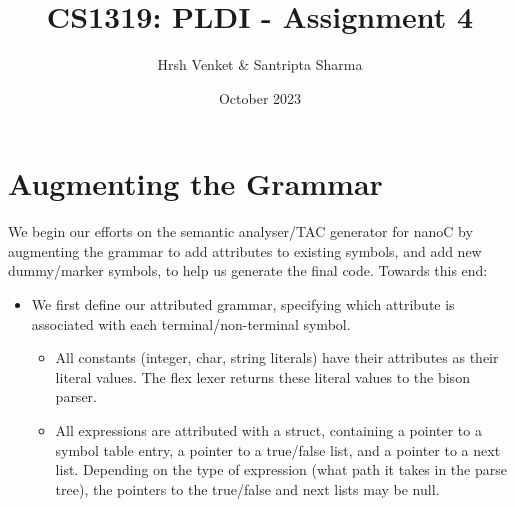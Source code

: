 \documentclass{article}
\title{CS1319: PLDI - Assignment 4}
\author{Hrsh Venket \& Santripta Sharma}
\date{October 2023}
\begin{document}
\maketitle 

\section{Augmenting the Grammar}
We begin our efforts on the semantic analyser/TAC generator for nanoC by augmenting the grammar to add attributes to existing symbols, and add new dummy/marker symbols, to help us generate the final code. Towards this end:

\begin{itemize}
	\item We first define our attributed grammar, specifying which attribute is associated with each terminal/non-terminal symbol. \begin{itemize}
		\item All constants (integer, char, string literals) have their attributes as their literal values. The flex lexer returns these literal values to the bison parser.
		\item All expressions are attributed with a struct, containing a pointer to a symbol table entry, a pointer to a true/false list, and a pointer to a next list. Depending on the type of expression (what path it takes in the parse tree), the pointers to the true/false and next lists may be null.
	\end{itemize}
\end{itemize}
\end{document}

